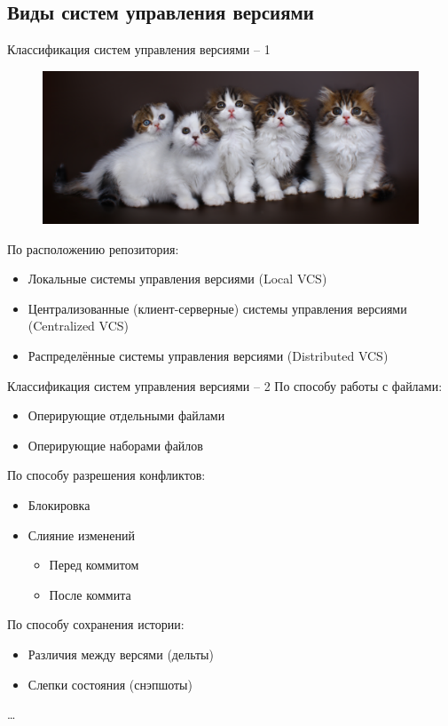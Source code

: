 \documentclass[presentation]{beamer}
\begin{document}


\subsection{Виды систем управления версиями}

\begin{frame}{Классификация систем управления версиями -- 1}
  \begin{figure}[htb]
    \centering
    \includegraphics[width=.9\textwidth]{scottish-kitten}
  \end{figure}

  По расположению репозитория:
  \begin{itemize}
  \item \alert{Локальные} системы управления версиями (Local VCS)
  \item \alert{Централизованные} (клиент-серверные) системы управления
    версиями (Centralized VCS)
  \item \alert{Распределённые} системы управления версиями (Distributed VCS)
  \end{itemize}
\end{frame}

\begin{frame}{Классификация систем управления версиями -- 2}
  По способу работы с файлами:
  \begin{itemize}
  \item Оперирующие отдельными файлами
  \item Оперирующие наборами файлов
  \end{itemize}

  \medskip

  По способу разрешения конфликтов:
  \begin{itemize}
  \item Блокировка
  \item Слияние изменений
    \begin{itemize}
    \item Перед коммитом
    \item После коммита
    \end{itemize}
  \end{itemize}

  \medskip

  По способу сохранения истории:
  \begin{itemize}
  \item Различия между версями (дельты)
  \item Слепки состояния (снэпшоты)
  \end{itemize}

  \ldots
\end{frame}
\end{document}
